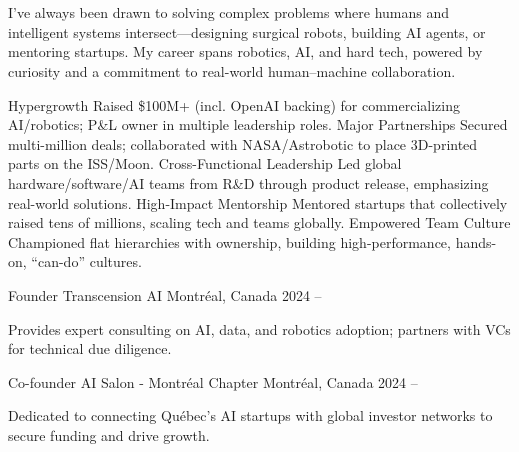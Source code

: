 \documentclass[11pt, letterpaper]{awesome-cv}
\begin{document}
\makecvheader

\begin{cvparagraph}
\\
\\
I've always been drawn to solving complex problems where humans and intelligent systems intersect—designing surgical robots, building AI agents, or mentoring startups. My career spans robotics, AI, and hard tech, powered by curiosity and a commitment to real-world human–machine collaboration.
\end{cvparagraph}

\begin{cvskills}
  \cvskill
    {Hypergrowth}
    {Raised \$100M+ (incl. OpenAI backing) for commercializing AI/robotics; P\&L owner in multiple leadership roles.}
  \cvskill
    {Major Partnerships}
    {Secured multi-million deals; collaborated with NASA/Astrobotic to place 3D-printed parts on the ISS/Moon.}
  \cvskill
    {Cross-Functional Leadership}
    {Led global hardware/software/AI teams from R\&D through product release, emphasizing real-world solutions.}
  \cvskill
    {High-Impact Mentorship}
    {Mentored startups that collectively raised tens of millions, scaling tech and teams globally.}
  \cvskill
    {Empowered Team Culture}
    {Championed flat hierarchies with ownership, building high-performance, hands-on, “can-do” cultures.}
\end{cvskills}


\cventry
    {Founder}
    {Transcension AI}
    {Montréal, Canada}
    {2024 -- }
    {
      \begin{cvitems}
        \item {Provides expert consulting on AI, data, and robotics adoption; partners with VCs for technical due diligence.}
      \end{cvitems}
    }

\cventry
    {Co-founder}
    {AI Salon - Montréal Chapter}
    {Montréal, Canada}
    {2024 -- }
    {
      \begin{cvitems}
        \item {Dedicated to connecting Québec’s AI startups with global investor networks to secure funding and drive growth.}
      \end{cvitems}
    }
\end{document}
